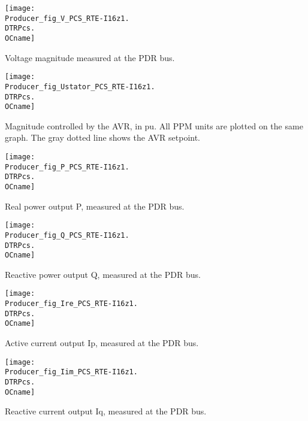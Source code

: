 {%
    \noindent
    \begin{minipage}[t]{0.48\textwidth}
        \centering
        \texttt{[image: \\Producer\_fig\_V\_PCS\_RTE-I16z1.\\DTRPcs.\\OCname]}
        \begin{minipage}[t]{0.8\textwidth}
            \small Voltage magnitude measured at the PDR bus.
        \end{minipage}
    \end{minipage}
    \hfill
    \begin{minipage}[t]{0.48\textwidth}
        \centering
        \texttt{[image: \\Producer\_fig\_Ustator\_PCS\_RTE-I16z1.\\DTRPcs.\\OCname]}
        \begin{minipage}[t]{0.8\textwidth}
            \small Magnitude controlled by the AVR, in pu. All PPM
            units are plotted on the same graph. The gray dotted
            line shows the AVR setpoint.
        \end{minipage}
    \end{minipage}
%
    \vspace{0.5cm}
    \begin{minipage}[t]{0.48\textwidth}
        \centering
        \texttt{[image: \\Producer\_fig\_P\_PCS\_RTE-I16z1.\\DTRPcs.\\OCname]}
        \begin{minipage}[t]{0.8\textwidth}
            \small Real power output P, measured at the PDR bus.
        \end{minipage}
    \end{minipage}
    \hfill
    \begin{minipage}[t]{0.48\textwidth}
        \centering
        \texttt{[image: \\Producer\_fig\_Q\_PCS\_RTE-I16z1.\\DTRPcs.\\OCname]}
        \begin{minipage}[t]{0.8\textwidth}
            \small Reactive power output Q, measured at the PDR bus.
        \end{minipage}
    \end{minipage}
%
    \vspace{0.5cm}
    \begin{minipage}[t]{0.48\textwidth}
        \centering
        \texttt{[image: \\Producer\_fig\_Ire\_PCS\_RTE-I16z1.\\DTRPcs.\\OCname]}
        \begin{minipage}[t]{0.8\textwidth}
            \small Active current output Ip, measured at the PDR bus.
        \end{minipage}
    \end{minipage}
    \hfill
    \begin{minipage}[t]{0.48\textwidth}
        \centering
        \texttt{[image: \\Producer\_fig\_Iim\_PCS\_RTE-I16z1.\\DTRPcs.\\OCname]}
        \begin{minipage}[t]{0.8\textwidth}
            \small Reactive current output Iq, measured at the PDR bus.
        \end{minipage}
    \end{minipage}
}
